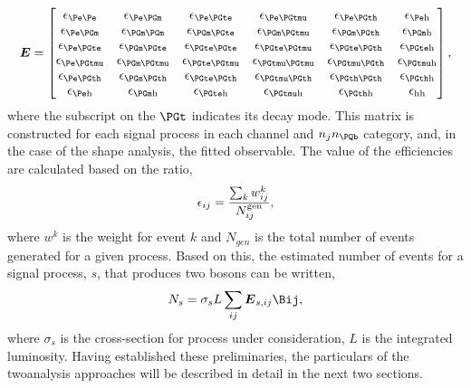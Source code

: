 \begin{equation}
\label{eqn:analysis:method:effMatrix:eff_matrix}
    \boldsymbol{E} = \begin{bmatrix}
        \epsilon_{\Pe\Pe}       & \epsilon_{\Pe\PGm}        & \epsilon_{\Pe\PGte}       & \epsilon_{\Pe\PGtmu}          & \epsilon_{\Pe\PGth}       & \epsilon_{\Pe \mathrm{h}}   \\
        \epsilon_{\Pe\PGm}      & \epsilon_{\PGm\PGm}       & \epsilon_{\PGm\PGte}      & \epsilon_{\PGm\PGtmu}         & \epsilon_{\PGm\PGth}      & \epsilon_{\PGm \mathrm{h}}  \\
        \epsilon_{\Pe\PGte}     & \epsilon_{\PGm\PGte}      & \epsilon_{\PGte\PGte}     & \epsilon_{\PGte\PGtmu}        & \epsilon_{\PGte\PGth}     & \epsilon_{\PGte \mathrm{h}} \\
        \epsilon_{\Pe\PGtmu}    & \epsilon_{\PGm\PGtmu}     & \epsilon_{\PGte\PGtmu}    & \epsilon_{\PGtmu\PGtmu}       & \epsilon_{\PGtmu\PGth}    & \epsilon_{\PGtmu \mathrm{h}}\\
        \epsilon_{\Pe\PGth}     & \epsilon_{\PGm\PGth}      & \epsilon_{\PGte\PGth}     & \epsilon_{\PGtmu\PGth}        & \epsilon_{\PGth\PGth}     & \epsilon_{\PGth \mathrm{h}} \\
        \epsilon_{\Pe\mathrm{h}}& \epsilon_{\PGm\mathrm{h}} & \epsilon_{\PGte\mathrm{h}}& \epsilon_{\PGtmu\mathrm{h}}   & \epsilon_{\PGth\mathrm{h}}& \epsilon_\mathrm{hh}        \\
    \end{bmatrix},
\end{equation}
\noindent where the subscript on the $\PGt$ indicates its decay mode.  This matrix is constructed for each signal process in each channel and $n_j n_\PQb$ category, and, in the case of the shape analysis, the fitted \pt observable.  The value of the efficiencies are calculated based on the ratio,
\begin{equation}
\label{eqn:analysis:method:effMatrix:model_eff}
    \epsilon_{ij} = \frac{\sum_{k}w_{ij}^k}{N^{\rm gen}_{ij}},
\end{equation}
\noindent where $w^{k}$ is the weight for event $k$ and $N_{gen}$ is the total number of events generated for a given process.  Based on this, the estimated number of events for a signal process, $s$, that produces two \PW bosons can be written,
\begin{equation}
\label{eqn:analysis:method:effMatrix:data_model}
    N_{s} = \sigma_{s} L \sum_{ij} \boldsymbol{E}_{s,ij} \Bij ,
\end{equation}
\noindent where $\sigma_{s}$ is the cross-section for process under consideration, $L$ is the integrated luminosity.  Having established these preliminaries, the particulars of the twoanalysis approaches will be described in detail in the next two sections.
\FloatBarrier






